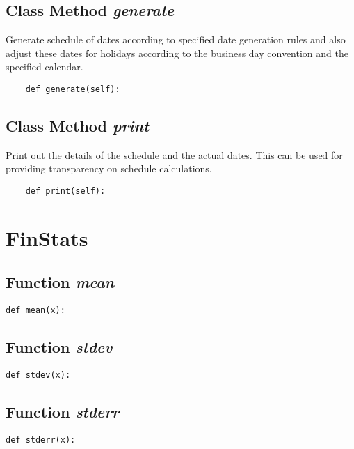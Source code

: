 \documentclass[twoside,11pt]{book}
\begin{document}
\subsection{Class Method {\it generate}}
Generate schedule of dates according to specified date generation rules and also adjust these dates for holidays according to the business day convention and the specified calendar. 

\begin{lstlisting}
    def generate(self):
\end{lstlisting}

\subsection{Class Method {\it print}}
Print out the details of the schedule and the actual dates. This can be used for providing transparency on schedule calculations. 

\begin{lstlisting}
    def print(self):
\end{lstlisting}

\newpage
\section{FinStats}

\subsection{Function {\it mean}}


\begin{lstlisting}
def mean(x):
\end{lstlisting}

\subsection{Function {\it stdev}}


\begin{lstlisting}
def stdev(x):
\end{lstlisting}

\subsection{Function {\it stderr}}


\begin{lstlisting}
def stderr(x):
\end{lstlisting}
\end{document}

